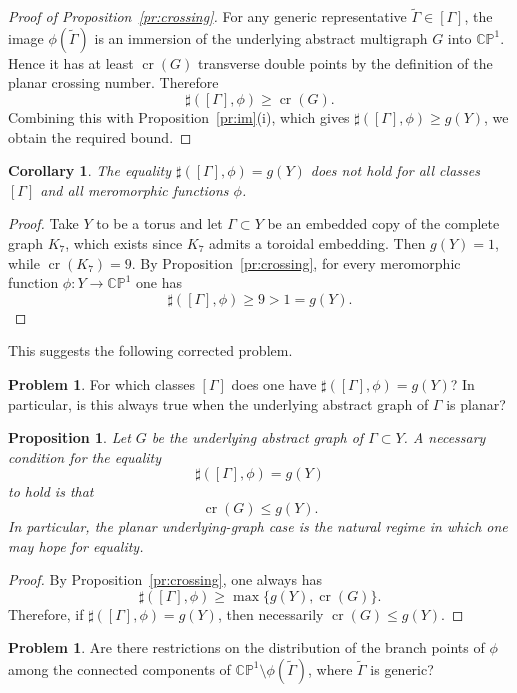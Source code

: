 \documentclass[reqno]{amsart}
\newtheorem{proposition}[theorem]{Proposition}
\newtheorem{corollary}[theorem]{Corollary}
\theoremstyle{definition}
\newtheorem{problem}[theorem]{Problem}
\newcommand {\Ga}{\Gamma}
\newcommand {\bCP} {\mathbb {CP}}
\newcommand \crs {\operatorname{cr}}
\begin{document}
\begin{proof}[Proof of Proposition~\ref{pr:crossing}]
For any generic representative $\widetilde\Ga\in[\Ga]$, the image $\phi(\widetilde\Ga)$ is an immersion of the underlying abstract multigraph $G$ into $\bCP^1$. Hence it has at least $\crs(G)$ transverse double points by the definition of the planar crossing number. Therefore
\[
\sharp([\Ga],\phi)\ge \crs(G).
\]
Combining this with Proposition~\ref{pr:im}(i), which gives $\sharp([\Ga],\phi)\ge g(Y)$, we obtain the required bound.
\end{proof}

\begin{corollary}\label{cor:mainconjfalse}
The equality $\sharp([\Ga],\phi)=g(Y)$ does not hold for all classes $[\Ga]$ and all meromorphic functions $\phi$.
\end{corollary}

\begin{proof}
Take $Y$ to be a torus and let $\Ga\subset Y$ be an embedded copy of the complete graph $K_7$, which exists since $K_7$ admits a toroidal embedding. Then $g(Y)=1$, while $\crs(K_7)=9$. By Proposition~\ref{pr:crossing}, for every meromorphic function $\phi:Y\to \bCP^1$ one has
\[
\sharp([\Ga],\phi)\ge 9>1=g(Y).
\]
\end{proof}

This suggests the following corrected problem.

\begin{problem}
For which classes $[\Ga]$ does one have $\sharp([\Ga],\phi)=g(Y)$? In particular, is this always true when the underlying abstract graph of $\Ga$ is planar?
\end{problem}

\begin{proposition}\label{pr:necessaryeq}
Let $G$ be the underlying abstract graph of $\Ga\subset Y$. A necessary condition for the equality
\[
\sharp([\Ga],\phi)=g(Y)
\]
to hold is that
\[
\crs(G)\le g(Y).
\]
In particular, the planar underlying-graph case is the natural regime in which one may hope for equality.
\end{proposition}

\begin{proof}
By Proposition~\ref{pr:crossing}, one always has
\[
\sharp([\Ga],\phi)\ge \max\{g(Y),\crs(G)\}.
\]
Therefore, if $\sharp([\Ga],\phi)=g(Y)$, then necessarily $\crs(G)\le g(Y)$.
\end{proof}

\begin{problem}
Are there restrictions on the distribution of the branch points of $\phi$ among the connected components of $\bCP^1\setminus \phi(\widetilde \Ga)$, where $\widetilde \Ga$ is generic?
\end{problem}
\end{document}
